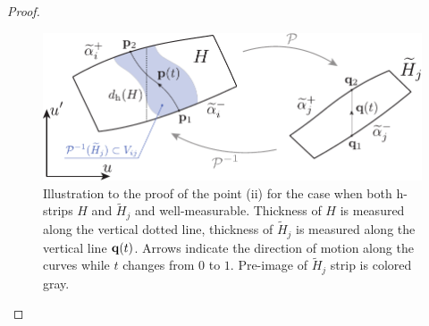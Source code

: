 \begin{proof}
	\begin{figure}[h]
	\centering
		\includegraphics[scale = 1]{pic/thickness of h-strip (a)}
		\caption{
			Illustration to the proof of the point (ii) for the case when both h-strips $H$ and $\widetilde{H}_j$ and well-measurable.
			Thickness of $H$ is measured along the vertical dotted line, thickness of $\widetilde{H}_j$ is measured along the vertical line $\vb{q}(t)$.
			Arrows indicate the direction of motion along the curves while $t$ changes from $0$ to $1$.
			Pre-image of $\widetilde{H}_j$ strip is colored gray.
		}
	\label{fig:thickness-of-h-strip-a}
	\end{figure}
	

\end{proof}
